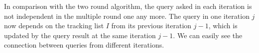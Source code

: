 In comparison with the two round algorithm, the query asked in each iteration is not independent  in the multiple round one any more. 
The query in one iteration $j$ now depends on the tracking list $I$ from its previous iteration $j-1$, which is updated by the query result at the same iteration $j-1$. We can easily see the connection between queries from different iterations.
%
%
%
